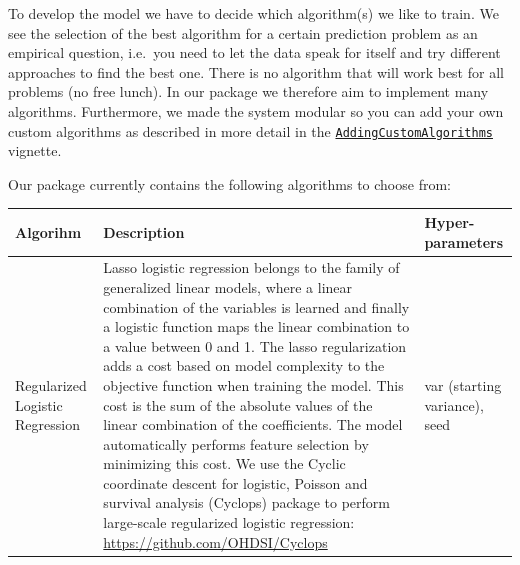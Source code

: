 \documentclass[]{article}
\begin{document}
To develop the model we have to decide which algorithm(s) we like to
train. We see the selection of the best algorithm for a certain
prediction problem as an empirical question, i.e.~you need to let the
data speak for itself and try different approaches to find the best one.
There is no algorithm that will work best for all problems (no free
lunch). In our package we therefore aim to implement many algorithms.
Furthermore, we made the system modular so you can add your own custom
algorithms as described in more detail in the
\href{Link\%20to\%20be\%20added}{\texttt{AddingCustomAlgorithms}}
vignette.

Our package currently contains the following algorithms to choose from:

\begin{longtable}[]{@{}lll@{}}
\toprule
\begin{minipage}[b]{0.12\columnwidth}\raggedright\strut
Algorihm\strut
\end{minipage} & \begin{minipage}[b]{0.55\columnwidth}\raggedright\strut
Description\strut
\end{minipage} & \begin{minipage}[b]{0.25\columnwidth}\raggedright\strut
Hyper-parameters\strut
\end{minipage}\tabularnewline
\midrule
\endhead
\begin{minipage}[t]{0.12\columnwidth}\raggedright\strut
Regularized Logistic Regression\strut
\end{minipage} & \begin{minipage}[t]{0.55\columnwidth}\raggedright\strut
Lasso logistic regression belongs to the family of generalized linear
models, where a linear combination of the variables is learned and
finally a logistic function maps the linear combination to a value
between 0 and 1. The lasso regularization adds a cost based on model
complexity to the objective function when training the model. This cost
is the sum of the absolute values of the linear combination of the
coefficients. The model automatically performs feature selection by
minimizing this cost. We use the Cyclic coordinate descent for logistic,
Poisson and survival analysis (Cyclops) package to perform large-scale
regularized logistic regression:
\url{https://github.com/OHDSI/Cyclops}\strut
\end{minipage} & \begin{minipage}[t]{0.25\columnwidth}\raggedright\strut
var (starting variance), seed\strut
\end{minipage}\tabularnewline

\end{longtable}
\end{document}
